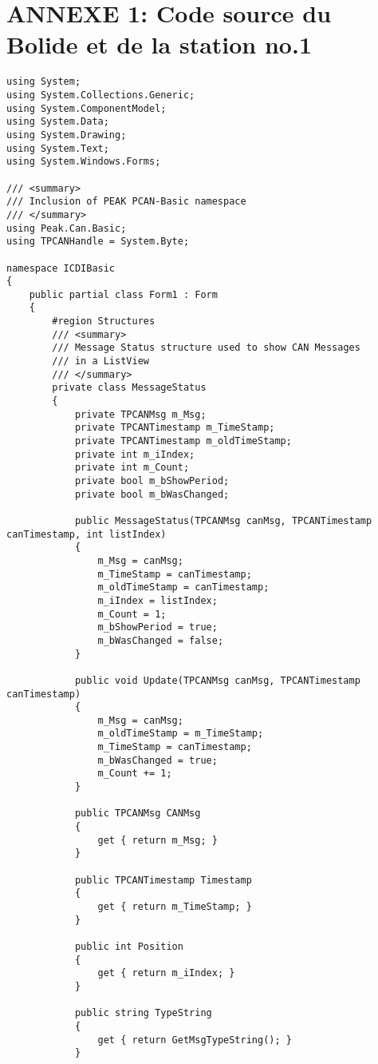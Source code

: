 \section{ANNEXE 1: Code source du Bolide et de la station no.1}
\begin{lstlisting}
using System;
using System.Collections.Generic;
using System.ComponentModel;
using System.Data;
using System.Drawing;
using System.Text;
using System.Windows.Forms;

/// <summary>
/// Inclusion of PEAK PCAN-Basic namespace
/// </summary>
using Peak.Can.Basic;
using TPCANHandle = System.Byte;

namespace ICDIBasic
{
    public partial class Form1 : Form
    {
        #region Structures
        /// <summary>
        /// Message Status structure used to show CAN Messages
        /// in a ListView
        /// </summary>
        private class MessageStatus
        {
            private TPCANMsg m_Msg;
            private TPCANTimestamp m_TimeStamp;
            private TPCANTimestamp m_oldTimeStamp;
            private int m_iIndex;
            private int m_Count;
            private bool m_bShowPeriod;
            private bool m_bWasChanged;

            public MessageStatus(TPCANMsg canMsg, TPCANTimestamp canTimestamp, int listIndex)
            {
                m_Msg = canMsg;
                m_TimeStamp = canTimestamp;
                m_oldTimeStamp = canTimestamp;
                m_iIndex = listIndex;
                m_Count = 1;
                m_bShowPeriod = true;
                m_bWasChanged = false;
            }

            public void Update(TPCANMsg canMsg, TPCANTimestamp canTimestamp)
            {
                m_Msg = canMsg;
                m_oldTimeStamp = m_TimeStamp;
                m_TimeStamp = canTimestamp;
                m_bWasChanged = true;
                m_Count += 1;
            }

            public TPCANMsg CANMsg
            {
                get { return m_Msg; }
            }

            public TPCANTimestamp Timestamp
            {
                get { return m_TimeStamp; }
            }

            public int Position
            {
                get { return m_iIndex; }
            }

            public string TypeString
            {
                get { return GetMsgTypeString(); }
            }


\end{lstlisting}
